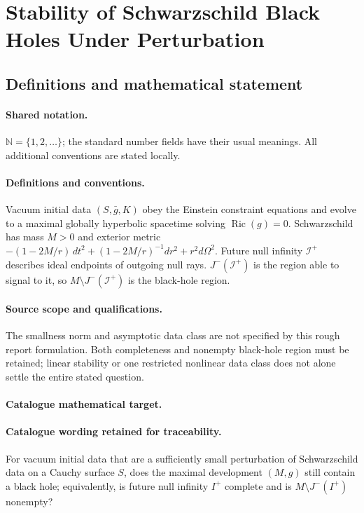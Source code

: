 \documentclass[11pt]{article}
\begin{document}
\section{Stability of Schwarzschild Black Holes Under Perturbation}\label{statement}

\subsection{Definitions and mathematical statement}

\paragraph{Shared notation.}$\mathbb N=\{1,2,\ldots\}$; the standard number fields have their usual meanings. All additional conventions are stated locally.


\paragraph{Definitions and conventions.} Vacuum initial data $(S,\bar g,K)$ obey the Einstein constraint equations and evolve to a maximal globally hyperbolic spacetime solving $\operatorname{Ric}(g)=0$. Schwarzschild has mass $M>0$ and exterior metric $-(1-2M/r)\,dt^2+(1-2M/r)^{-1}dr^2+r^2d\Omega^2$. Future null infinity $\mathcal I^+$ describes ideal endpoints of outgoing null rays. $J^-(\mathcal I^+)$ is the region able to signal to it, so $M\setminus J^-(\mathcal I^+)$ is the black-hole region.

\paragraph{Source scope and qualifications.} The smallness norm and asymptotic data class are not specified by this rough report formulation. Both completeness and nonempty black-hole region must be retained; linear stability or one restricted nonlinear data class does not alone settle the entire stated question.

\paragraph{Catalogue mathematical target.}
\paragraph{Catalogue wording retained for traceability.}
For vacuum initial data that are a sufficiently small perturbation of Schwarzschild data on a Cauchy surface $S$, does the maximal development $(M,g)$ still contain a black hole; equivalently, is future null infinity $I^+$ complete and is $M\setminus J^-(I^+)$ nonempty?
\end{document}
